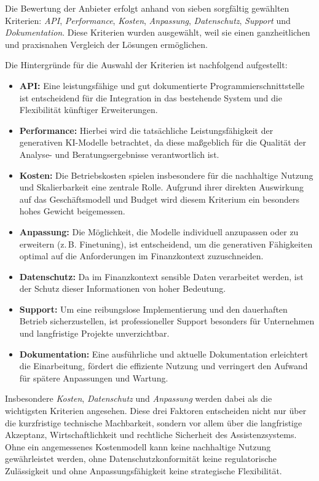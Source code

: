     Die Bewertung der Anbieter erfolgt anhand von sieben sorgfältig gewählten Kriterien: \textit{\acs{API}}, \textit{Performance}, \textit{Kosten}, \textit{Anpassung}, \textit{Datenschutz}, \textit{Support} und \textit{Dokumentation}.
    Diese Kriterien wurden ausgewählt, weil sie einen ganzheitlichen und praxisnahen Vergleich der Lösungen ermöglichen.

    Die Hintergründe für die Auswahl der Kriterien ist nachfolgend aufgestellt:
    \begin{itemize}
      \item \textbf{\acs{API}:} Eine leistungsfähige und gut dokumentierte Programmierschnittstelle ist entscheidend für die Integration in das bestehende System und die Flexibilität künftiger Erweiterungen.
      \item \textbf{Performance:} Hierbei wird die tatsächliche Leistungsfähigkeit der generativen \acs{KI}-Modelle betrachtet, da diese maßgeblich für die Qualität der Analyse- und Beratungsergebnisse verantwortlich ist.
      \item \textbf{Kosten:} Die Betriebskosten spielen insbesondere für die nachhaltige Nutzung und Skalierbarkeit eine zentrale Rolle. Aufgrund ihrer direkten Auswirkung auf das Geschäftsmodell und Budget wird diesem Kriterium ein besonders hohes Gewicht beigemessen.
      \item \textbf{Anpassung:} Die Möglichkeit, die Modelle individuell anzupassen oder zu erweitern (z.\,B. Finetuning), ist entscheidend, um die generativen Fähigkeiten optimal auf die Anforderungen im Finanzkontext zuzuschneiden.
      \item \textbf{Datenschutz:} Da im Finanzkontext sensible Daten verarbeitet werden, ist der Schutz dieser Informationen von hoher Bedeutung.
      \item \textbf{Support:} Um eine reibungslose Implementierung und den dauerhaften Betrieb sicherzustellen, ist professioneller Support besonders für Unternehmen und langfristige Projekte unverzichtbar.
      \item \textbf{Dokumentation:} Eine ausführliche und aktuelle Dokumentation erleichtert die Einarbeitung, fördert die effiziente Nutzung und verringert den Aufwand für spätere Anpassungen und Wartung.
    \end{itemize}

    Insbesondere \textit{Kosten}, \textit{Datenschutz} und \textit{Anpassung} werden dabei als die wichtigsten Kriterien angesehen.
    Diese drei Faktoren entscheiden nicht nur über die kurzfristige technische Machbarkeit, sondern vor allem über die langfristige Akzeptanz, Wirtschaftlichkeit und rechtliche Sicherheit des Assistenzsystems.
    Ohne ein angemessenes Kostenmodell kann keine nachhaltige Nutzung gewährleistet werden, ohne Datenschutzkonformität keine regulatorische Zulässigkeit und ohne Anpassungsfähigkeit keine strategische Flexibilität.


